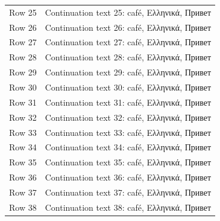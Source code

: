 \documentclass{article}
\begin{document}
\begin{longtable}{>{\raggedright\arraybackslash}p{}>{\raggedright\arraybackslash}p{}}
Row 25\par  & Continuation text 25: café, Ελληνικά, Привет\par  \\
Row 26\par  & Continuation text 26: café, Ελληνικά, Привет\par  \\
Row 27\par  & Continuation text 27: café, Ελληνικά, Привет\par  \\
Row 28\par  & Continuation text 28: café, Ελληνικά, Привет\par  \\
Row 29\par  & Continuation text 29: café, Ελληνικά, Привет\par  \\
Row 30\par  & Continuation text 30: café, Ελληνικά, Привет\par  \\
Row 31\par  & Continuation text 31: café, Ελληνικά, Привет\par  \\
Row 32\par  & Continuation text 32: café, Ελληνικά, Привет\par  \\
Row 33\par  & Continuation text 33: café, Ελληνικά, Привет\par  \\
Row 34\par  & Continuation text 34: café, Ελληνικά, Привет\par  \\
Row 35\par  & Continuation text 35: café, Ελληνικά, Привет\par  \\
Row 36\par  & Continuation text 36: café, Ελληνικά, Привет\par  \\
Row 37\par  & Continuation text 37: café, Ελληνικά, Привет\par  \\
Row 38\par  & Continuation text 38: café, Ελληνικά, Привет\par  \\

\end{longtable}
\end{document}

